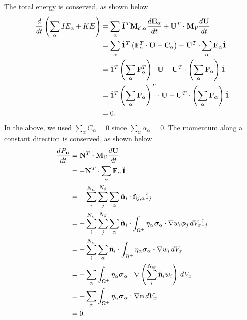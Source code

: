\documentclass[11pt]{report}
\begin{document}
The total energy is conserved, as shown below
\begin{align}
    \frac{d}{dt} \left( \sum_\alpha IE_\alpha + KE \right) &= \sum_\alpha \hat{\mathbf{1}}^T \mathbf{M}_{\mathcal{E},\alpha} \frac{d\mathbf{E}_\alpha}{dt} + \mathbf{U}^T \cdot \mathbf{M}_\mathcal{V} \frac{d\mathbf{U}}{dt} \nonumber \\
    &= \sum_\alpha \hat{\mathbf{1}}^T \left( \mathbf{F}^T_\alpha \cdot \mathbf{U} - \mathbf{C}_\alpha \right) - \mathbf{U}^T \cdot \sum_\alpha \mathbf{F}_\alpha \hat{\mathbf{1}} \nonumber \\
    &= \hat{\mathbf{1}}^T \left( \sum_\alpha \mathbf{F}^T_\alpha \right) \cdot \mathbf{U} - \mathbf{U}^T \cdot \left( \sum_\alpha \mathbf{F}_\alpha \right) \hat{\mathbf{1}} \nonumber \\
    &= \hat{\mathbf{1}}^T \left( \sum_\alpha \mathbf{F}_\alpha \right)^T \cdot \mathbf{U} - \mathbf{U}^T \cdot \left( \sum_\alpha \mathbf{F}_\alpha \right) \hat{\mathbf{1}} \nonumber \\
    &= 0.
\end{align}
In the above, we used $\sum_\alpha C_\alpha = 0$ since $\sum_\alpha \alpha_\alpha = 0$. The momentum along a constant direction is conserved, as shown below
\begin{align}
    \frac{d P_{\mathbf{n}}}{dt} &= \mathbf{N}^T \cdot \mathbf{M}_\mathcal{V} \frac{d \mathbf{U}}{dt} \nonumber \\
    &= -\mathbf{N}^T \cdot \sum_\alpha \mathbf{F}_\alpha \hat{\mathbf{1}} \nonumber \\
    &= -\sum_i^{N_w} \sum_j^{N_\phi} \sum_\alpha \hat{\mathbf{n}}_i \cdot \mathbf{f}_{ij,\alpha} \hat{1}_j \nonumber \\
    &= -\sum_i^{N_w} \sum_j^{N_\phi} \sum_\alpha \hat{\mathbf{n}}_i \cdot \int_{\Omega^+} \eta_\alpha \bm \sigma_\alpha \cdot \nabla w_i \phi_j \, dV_x \hat{1}_j \nonumber \\
    &= -\sum_i^{N_w} \sum_\alpha \hat{\mathbf{n}}_i \cdot \int_{\Omega^+} \eta_\alpha \bm \sigma_\alpha \cdot \nabla w_i \, dV_x \nonumber \\
    &= - \sum_\alpha \int_{\Omega^+} \eta_\alpha \bm \sigma_\alpha : \nabla \left( \sum_i^{N_w} \hat{\mathbf{n}}_i w_i \right) \, dV_x \nonumber \\
    &= -\sum_\alpha \int_{\Omega^+} \eta_\alpha \bm \sigma_\alpha : \nabla \mathbf{n} \, dV_x \nonumber \\
    &= 0.
\end{align}

\end{document}
